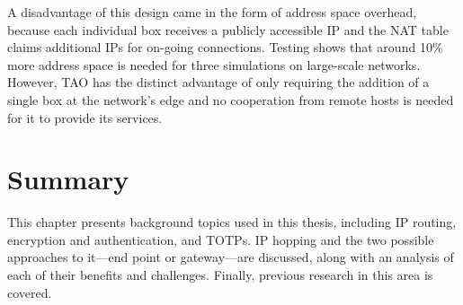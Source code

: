 \par A disadvantage of this design came in the form of address space overhead, because each individual box receives a publicly accessible \ac{IP} and the \ac{NAT} table claims additional \acp{IP} for on-going connections. Testing shows that around 10\% more address space is needed for three simulations on large-scale networks. However, \ac{TAO} has the distinct advantage of only requiring the addition of a single box at the network's edge and no cooperation from remote hosts is needed for it to provide its services.

\section{Summary}
\label{sec:background_summary}
\par This chapter presents background topics used in this thesis, including \ac{IP} routing, encryption and authentication, and \aclp{TOTP}. \ac{IP} hopping and the two possible approaches to it---end point or gateway---are discussed, along with an analysis of each of their benefits and challenges. Finally, previous research in this area is covered.

